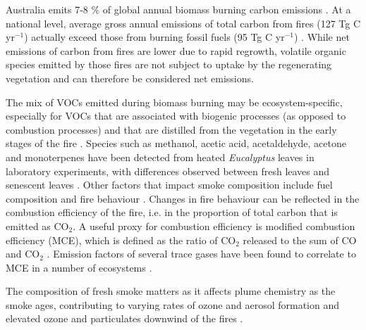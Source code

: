 \documentclass[acp, manuscript]{copernicus}
\begin{document}
Australia emits 7-8 $\%$ of global annual biomass burning carbon emissions \citep{Ito2004,VanderWerf2010}. At a national level, average gross annual emissions of total carbon from fires (127 Tg C yr$^{-1}$) actually exceed those from burning fossil fuels (95 Tg C yr$^{-1}$) \citep{Haverd2013}. While net emissions of carbon from fires are lower due to rapid regrowth, volatile organic species emitted by those fires are not subject to uptake by the regenerating vegetation and can therefore be considered net emissions. 

The mix of VOCs emitted during biomass burning may be ecosystem-specific, especially for VOCs that are associated with biogenic processes (as opposed to combustion processes) and that are distilled from the vegetation in the early stages of the fire \citep{Ciccioli2014}. Species such as methanol, acetic acid, acetaldehyde, acetone and monoterpenes have been detected from heated \textit{Eucalyptus} leaves in laboratory experiments, with differences observed between fresh leaves and senescent leaves \citep{Greenberg2006,Maleknia2007,Maleknia2009,Possell2013}. Other factors that impact smoke composition include fuel composition \citep[e.g. nitrogen content,][]{Coggon2016} and fire behaviour \citep[e.g.][]{Wooster2011}. %
Changes in fire behaviour can be reflected in the combustion efficiency of the fire, i.e. in the proportion of total carbon that is emitted as CO$_2$. A useful proxy for combustion efficiency is modified combustion efficiency (MCE), which is defined as the ratio of CO$_2$ released to the sum of CO and CO$_2$ \citep{Hao1993,Yokelson1996}. Emission factors of several trace gases have been found to correlate to MCE in a number of ecosystems \citep[e.g.][]{Akagi2013, Burling2011, Meyer2012}.

The composition of fresh smoke matters as it affects plume chemistry as the smoke ages, contributing to varying rates of ozone and aerosol formation \citep{Yokelson2009,Akagi2012,Alvarado2015} and elevated ozone and particulates downwind of the fires \citep{Pfister2008,Yan2008}.
\end{document}
